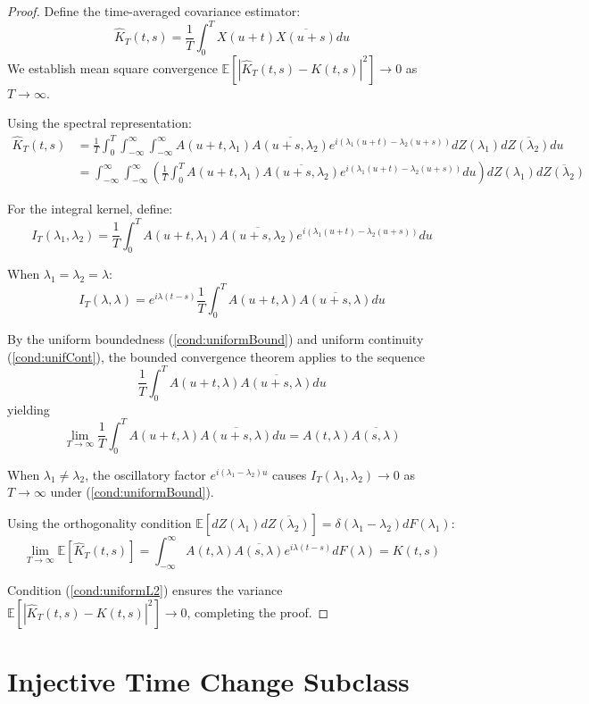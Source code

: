 \documentclass{article}
\newtheorem{proof}{Proof}
\begin{document}
\begin{proof}
Define the time-averaged covariance estimator:
\[
\hat{K}_T(t,s) = \frac{1}{T} \int_0^T X(u+t) \overline{X(u+s)} du
\]
We establish mean square convergence $\mathbb{E}[|\hat{K}_T(t,s) - K(t,s)|^2] \to 0$ as $T \to \infty$.

Using the spectral representation:
\begin{align}
\hat{K}_T(t,s) &= \frac{1}{T} \int_0^T \int_{-\infty}^{\infty} \int_{-\infty}^{\infty} A(u+t,\lambda_1) \overline{A(u+s,\lambda_2)} e^{i(\lambda_1(u+t) - \lambda_2(u+s))} dZ(\lambda_1) d\overline{Z(\lambda_2)} du \\
&= \int_{-\infty}^{\infty} \int_{-\infty}^{\infty} \left(\frac{1}{T} \int_0^T A(u+t,\lambda_1) \overline{A(u+s,\lambda_2)} e^{i(\lambda_1(u+t) - \lambda_2(u+s))} du\right) dZ(\lambda_1) d\overline{Z(\lambda_2)}
\end{align}

For the integral kernel, define:
\[
I_T(\lambda_1,\lambda_2) = \frac{1}{T} \int_0^T A(u+t,\lambda_1) \overline{A(u+s,\lambda_2)} e^{i(\lambda_1(u+t) - \lambda_2(u+s))} du
\]

When $\lambda_1 = \lambda_2 = \lambda$:
\[
I_T(\lambda,\lambda) = e^{i\lambda(t-s)} \frac{1}{T} \int_0^T A(u+t,\lambda) \overline{A(u+s,\lambda)} du
\]

By the uniform boundedness (\ref{cond:uniformBound}) and uniform continuity (\ref{cond:unifCont}), the bounded convergence theorem applies to the sequence
\[
\frac{1}{T} \int_0^T A(u+t,\lambda) \overline{A(u+s,\lambda)} du
\]
yielding
\[
\lim_{T \to \infty} \frac{1}{T} \int_0^T A(u+t,\lambda) \overline{A(u+s,\lambda)} du = A(t,\lambda) \overline{A(s,\lambda)}
\]

When $\lambda_1 \neq \lambda_2$, the oscillatory factor $e^{i(\lambda_1 - \lambda_2)u}$ causes $I_T(\lambda_1,\lambda_2) \to 0$ as $T \to \infty$ under (\ref{cond:uniformBound}).

Using the orthogonality condition $\mathbb{E}[dZ(\lambda_1) d\overline{Z(\lambda_2)}] = \delta(\lambda_1 - \lambda_2) dF(\lambda_1)$:
\[
\lim_{T \to \infty} \mathbb{E}[\hat{K}_T(t,s)] = \int_{-\infty}^{\infty} A(t,\lambda) \overline{A(s,\lambda)} e^{i\lambda(t-s)} dF(\lambda) = K(t,s)
\]

Condition (\ref{cond:uniformL2}) ensures the variance $\mathbb{E}[|\hat{K}_T(t,s) - K(t,s)|^2] \to 0$, completing the proof.
\end{proof}

\section{Injective Time Change Subclass}
\end{document}
